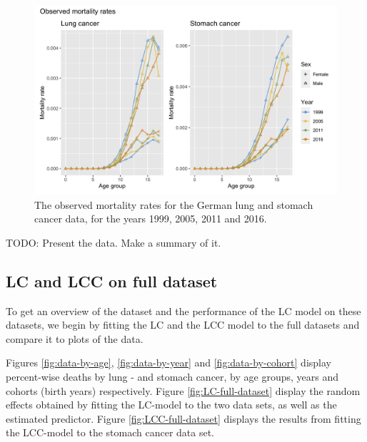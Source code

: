 \begin{figure}
    \centering
    \includegraphics[width=0.85\linewidth]{real-data/real-data-univariate/Figures/data-age-rate.png}
    \caption{The observed mortality rates for the German lung and stomach cancer data, for the years 1999, 2005, 2011 and 2016.}
    \label{fig:data-age-rate}
\end{figure}

\textcolor{myDarkGreen}{TODO: Present the data. Make a summary of it. }

\subsection{LC and LCC on full dataset}
\label{sec:LC-full-data}
To get an overview of the dataset and the performance of the LC model on these datasets, we begin by fitting the LC and the LCC model to the full datasets and compare it to plots of the data. 

\newpar Figures \ref{fig:data-by-age}, \ref{fig:data-by-year} and \ref{fig:data-by-cohort} display percent-wise deaths by lung - and stomach cancer, by age groups, years and cohorts (birth years) respectively. Figure \ref{fig:LC-full-dataset} display the random effects obtained by fitting the LC-model to the two data sets, as well as the estimated predictor. Figure \ref{fig:LCC-full-dataset} displays the results from fitting the LCC-model to the stomach cancer data set. 

